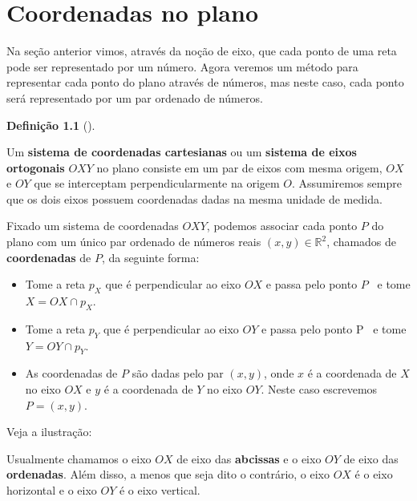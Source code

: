 \documentclass[
  brazilian,
  letterpaper,
  DIV=11,
  numbers=noendperiod]{scrreprt}
\providecommand{\tightlist}{%
  \setlength{\itemsep}{0pt}\setlength{\parskip}{0pt}}
\theoremstyle{definition}
\newtheorem{definition}{Definição}[chapter]
\theoremstyle{plain}
\theoremstyle{definition}
\theoremstyle{remark}
\begin{document}

\chapter{Coordenadas no plano}\label{coordenadas-no-plano}

Na seção anterior vimos, através da noção de eixo, que cada ponto de uma
reta pode ser representado por um número. Agora veremos um método para
representar cada ponto do plano através de números, mas neste caso, cada
ponto será representado por um par ordenado de números.

\begin{definition}[]\protect\hypertarget{def-sistema-eixos-ortogonais}{}\label{def-sistema-eixos-ortogonais}

Um \textbf{sistema de coordenadas cartesianas} ou um \textbf{sistema de
eixos ortogonais} \(OXY\) no plano consiste em um par de eixos com mesma
origem, \(OX\) e \(OY\) que se interceptam perpendicularmente na origem
\(O\). Assumiremos sempre que os dois eixos possuem coordenadas dadas na
mesma unidade de medida.

\end{definition}

Fixado um sistema de coordenadas \(OXY\), podemos associar cada ponto
\(P\) do plano com um único par ordenado de números reais
\(\left(x,y\right)\in\mathbb{R}^2\), chamados de \textbf{coordenadas} de
\(P\), da seguinte forma:

\begin{itemize}
\tightlist
\item
  Tome a reta \(p_X\) que é perpendicular ao eixo \(OX\) e passa pelo
  ponto \(P\)~ e tome \(X=OX\cap p_X\).
\item
  Tome a reta \(p_Y\) que é perpendicular ao eixo \(OY\) e passa pelo
  ponto P~ e tome \(Y=OY\cap p_Y\).
\item
  As coordenadas de \(P\) são dadas pelo par \(\left(x,y\right )\), onde
  \(x\) é a coordenada de \(X\) no eixo \(OX\) e \(y\) é a coordenada de
  \(Y\) no eixo \(OY\). Neste caso escrevemos \(P=\left ( x,y\right )\).
\end{itemize}

Veja a ilustração:

Usualmente chamamos o eixo \(OX\) de eixo das \textbf{abcissas} e o eixo
\(OY\) de eixo das \textbf{ordenadas}. Além disso, a menos que seja dito
o contrário, o eixo \(OX\) é o eixo horizontal e o eixo \(OY\) é o eixo
vertical.
\end{document}
